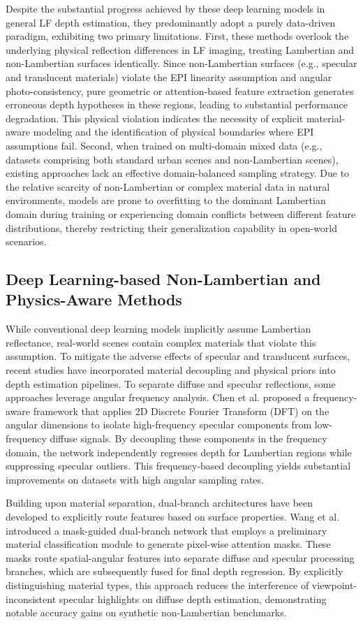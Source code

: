 Despite the substantial progress achieved by these deep learning models in general LF depth estimation, they predominantly adopt a purely data-driven paradigm, exhibiting two primary limitations. First, these methods overlook the underlying physical reflection differences in LF imaging, treating Lambertian and non-Lambertian surfaces identically. Since non-Lambertian surfaces (e.g., specular and translucent materials) violate the EPI linearity assumption and angular photo-consistency, pure geometric or attention-based feature extraction generates erroneous depth hypotheses in these regions, leading to substantial performance degradation. This physical violation indicates the necessity of explicit material-aware modeling and the identification of physical boundaries where EPI assumptions fail. Second, when trained on multi-domain mixed data (e.g., datasets comprising both standard urban scenes and non-Lambertian scenes), existing approaches lack an effective domain-balanced sampling strategy. Due to the relative scarcity of non-Lambertian or complex material data in natural environments, models are prone to overfitting to the dominant Lambertian domain during training or experiencing domain conflicts between different feature distributions, thereby restricting their generalization capability in open-world scenarios.

\subsection{Deep Learning-based Non-Lambertian and Physics-Aware Methods}

While conventional deep learning models implicitly assume Lambertian reflectance, real-world scenes contain complex materials that violate this assumption. To mitigate the adverse effects of specular and translucent surfaces, recent studies have incorporated material decoupling and physical priors into depth estimation pipelines. To separate diffuse and specular reflections, some approaches leverage angular frequency analysis. Chen et al. proposed a frequency-aware framework that applies 2D Discrete Fourier Transform (DFT) on the angular dimensions to isolate high-frequency specular components from low-frequency diffuse signals. By decoupling these components in the frequency domain, the network independently regresses depth for Lambertian regions while suppressing specular outliers. This frequency-based decoupling yields substantial improvements on datasets with high angular sampling rates.

Building upon material separation, dual-branch architectures have been developed to explicitly route features based on surface properties. Wang et al. introduced a mask-guided dual-branch network that employs a preliminary material classification module to generate pixel-wise attention masks. These masks route spatial-angular features into separate diffuse and specular processing branches, which are subsequently fused for final depth regression. By explicitly distinguishing material types, this approach reduces the interference of viewpoint-inconsistent specular highlights on diffuse depth estimation, demonstrating notable accuracy gains on synthetic non-Lambertian benchmarks.


